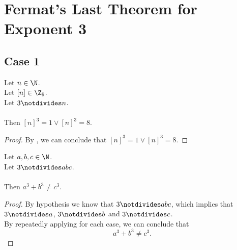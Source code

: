 
\chapter{Fermat's Last Theorem for Exponent 3}

\section{Case 1}


\begin{lemma}
  \label{lmm:cube_of_not_dvd}
  \leanok
  Let $n \in \N$. \\
  Let $\left[n \right] \in \Z_9$. \\
  Let $3 \notdivides n$. \\ \\
  Then $\left[n \right]^3 = 1 \lor \left[n \right]^3 = 8$.
\end{lemma}
\begin{proof}
  \leanok
  By , we can conclude that $\left[n \right]^3 = 1 \lor \left[n \right]^3 = 8$.
\end{proof}

\begin{theorem}
    \label{thm:fermatLastTheoremThree_case_1}
    \leanok
    Let $a, b, c \in \N$. \\
    Let $3 \notdivides abc$. \\\\
    Then $a ^ 3 + b ^ 3 \neq c ^ 3$.
\end{theorem}
\begin{proof}
  \leanok
  By hypothesis we know that $3 \notdivides abc$, which implies that $3 \notdivides a$, $3 \notdivides b$ and $3 \notdivides c$. \\
  By repeatedly applying  for each case,
  we can conclude that $$a ^ 3 + b ^ 3 \neq c ^ 3.$$
\end{proof}

